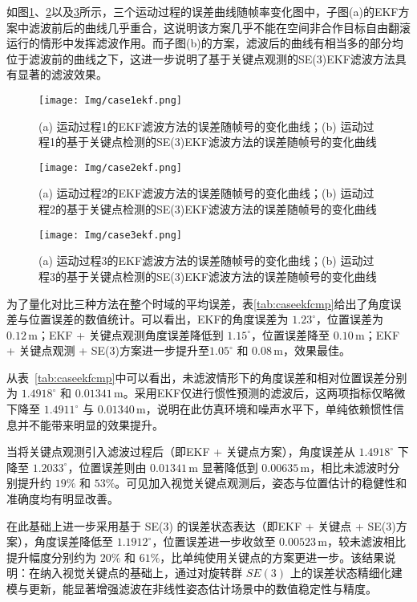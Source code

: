 如图\ref{fig:case1efk}、\ref{fig:case2efk}以及\ref{fig:case3efk}所示，三个运动过程的误差曲线随帧率变化图中，子图(a)的EKF方案中滤波前后的曲线几乎重合，这说明该方案几乎不能在空间非合作目标自由翻滚运行的情形中发挥滤波作用。而子图(b)的方案，滤波后的曲线有相当多的部分均位于滤波前的曲线之下，这进一步说明了基于关键点观测的SE(3)EKF滤波方法具有显著的滤波效果。

\begin{figure}[htbp]
	\centering
	\texttt{[image: Img/case1ekf.png]}
	\caption{(a) 运动过程1的EKF滤波方法的误差随帧号的变化曲线；(b) 运动过程1的基于关键点检测的SE(3)EKF滤波方法的误差随帧号的变化曲线}
	\label{fig:case1efk}
\end{figure}

\begin{figure}[htbp]
	\centering
	\texttt{[image: Img/case2ekf.png]}
	\caption{(a) 运动过程2的EKF滤波方法的误差随帧号的变化曲线；(b) 运动过程2的基于关键点检测的SE(3)EKF滤波方法的误差随帧号的变化曲线}
	\label{fig:case2efk}
\end{figure}

\begin{figure}[htbp]
	\centering
	\texttt{[image: Img/case3ekf.png]}
	\caption{(a) 运动过程3的EKF滤波方法的误差随帧号的变化曲线；(b) 运动过程3的基于关键点检测的SE(3)EKF滤波方法的误差随帧号的变化曲线}
	\label{fig:case3efk}
\end{figure}

为了量化对比三种方法在整个时域的平均误差，表\ref{tab:caseekfcmp}给出了角度误差与位置误差的数值统计。可以看出，EKF的角度误差为 $1.23^\circ$，位置误差为 $0.12\,\mathrm{m}$；EKF + 关键点观测角度误差降低到 $1.15^\circ$，位置误差降至 $0.10\,\mathrm{m}$；EKF + 关键点观测 + SE(3)方案进一步提升至$1.05^\circ$ 和 $0.08\,\mathrm{m}$，效果最佳。

从表~\ref{tab:caseekfcmp}中可以看出，未滤波情形下的角度误差和相对位置误差分别为 $1.4918^\circ$ 和 $0.01341\,\mathrm{m}$。采用EKF仅进行惯性预测的滤波后，这两项指标仅略微下降至 $1.4911^\circ$ 与 $0.01340\,\mathrm{m}$，说明在此仿真环境和噪声水平下，单纯依赖惯性信息并不能带来明显的效果提升。

当将关键点观测引入滤波过程后（即EKF + 关键点方案），角度误差从 $1.4918^\circ$ 下降至 $1.2033^\circ$，位置误差则由 $0.01341\,\mathrm{m}$ 显著降低到 $0.00635\,\mathrm{m}$，相比未滤波时分别提升约 $19\%$ 和 $53\%$。可见加入视觉关键点观测后，姿态与位置估计的稳健性和准确度均有明显改善。

在此基础上进一步采用基于 SE(3) 的误差状态表达（即EKF + 关键点 + SE(3)方案），角度误差降低至 $1.1912^\circ$，位置误差进一步收敛至 $0.00523\,\mathrm{m}$，较未滤波相比提升幅度分别约为 $20\%$ 和 $61\%$，比单纯使用关键点的方案更进一步。该结果说明：在纳入视觉关键点的基础上，通过对旋转群 $SE(3)$ 上的误差状态精细化建模与更新，能显著增强滤波在非线性姿态估计场景中的数值稳定性与精度。
\vspace{5pt}


